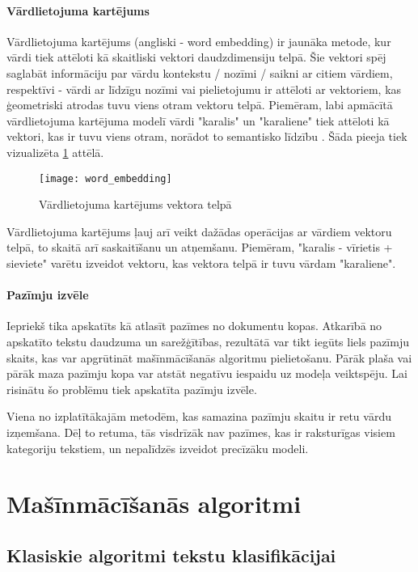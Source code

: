 \subsubsection{Vārdlietojuma kartējums}
Vārdlietojuma kartējums (angliski - word embedding) ir jaunāka metode, kur vārdi tiek attēloti kā skaitliski vektori daudzdimensiju telpā. Šie vektori spēj saglabāt informāciju par vārdu kontekstu / nozīmi / saikni ar citiem vārdiem, respektīvi -  vārdi ar līdzīgu nozīmi vai pielietojumu ir attēloti ar vektoriem, kas ģeometriski atrodas tuvu viens otram vektoru telpā. Piemēram, labi apmācītā vārdlietojuma kartējuma modelī vārdi "karalis" un "karaliene" tiek attēloti kā vektori, kas ir tuvu viens otram, norādot to semantisko līdzību \cite{BaeldungEmbedding}. Šāda pieeja tiek vizualizēta \ref{fig:wordembedding} attēlā.

\begin{figure}[H]
	\texttt{[image: word\_embedding]}
	\caption{Vārdlietojuma kartējums vektora telpā \cite{BaeldungEmbedding} }
	\label{fig:wordembedding}
\end{figure}

Vārdlietojuma kartējums ļauj arī veikt dažādas operācijas ar vārdiem vektoru telpā, to skaitā arī  saskaitīšanu un atņemšanu. Piemēram, "karalis - vīrietis + sieviete" varētu izveidot vektoru, kas vektora telpā ir tuvu vārdam "karaliene".

\subsubsection{Pazīmju izvēle}
Iepriekš tika apskatīts kā atlasīt pazīmes no dokumentu kopas. Atkarībā no apskatīto tekstu daudzuma un sarežģītības, rezultātā var tikt iegūts liels pazīmju skaits, kas var apgrūtināt mašīnmācīšanās algoritmu pielietošanu. Pārāk plaša vai pārāk maza pazīmju kopa var atstāt negatīvu iespaidu uz modeļa veiktspēju. Lai risinātu šo problēmu tiek apskatīta pazīmju izvēle.

Viena no izplatītākajām metodēm, kas samazina pazīmju skaitu ir retu vārdu izņemšana. Dēļ to retuma, tās visdrīzāk nav pazīmes, kas ir raksturīgas visiem kategoriju tekstiem, un nepalīdzēs izveidot precīzāku modeli.

\chapter{Mašīnmācīšanās algoritmi}

\section{Klasiskie algoritmi tekstu klasifikācijai}

